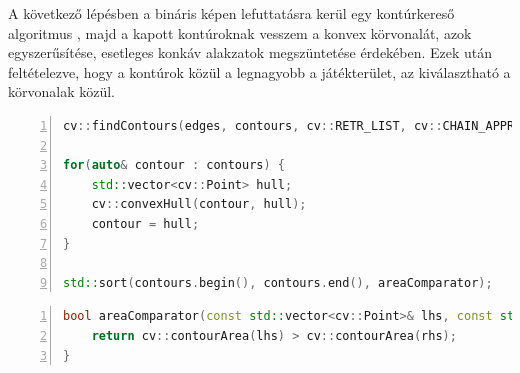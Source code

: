 \par A következő lépésben a bináris képen lefuttatásra kerül egy kontúrkereső algoritmus \cite{SUZUKI198532}, majd a kapott kontúroknak vesszem a konvex körvonalát, azok egyszerűsítése, esetleges konkáv alakzatok megszüntetése érdekében. Ezek után feltételezve, hogy a kontúrok közül a legnagyobb a játékterület, az kiválasztható a körvonalak közül.

\vspace{2mm}
\hspace{-10mm}
\begin{minipage}{\linewidth}
\begin{lstlisting}[language=C++, numbers=left, caption={Kontúrok keresése.}, label={cod:contours}]
cv::findContours(edges, contours, cv::RETR_LIST, cv::CHAIN_APPROX_SIMPLE);

for(auto& contour : contours) {
    std::vector<cv::Point> hull;
    cv::convexHull(contour, hull);
    contour = hull;
}

std::sort(contours.begin(), contours.end(), areaComparator);
\end{lstlisting}
\end{minipage}

\vspace{2mm}
\hspace{-10mm}
\begin{minipage}{\linewidth}
\begin{lstlisting}[language=C++, numbers=left, caption={Sorba rendezéshez használt segédfüggvény.}, label={cod:contours_helper}]
bool areaComparator(const std::vector<cv::Point>& lhs, const std::vector<cv::Point>& rhs) {
    return cv::contourArea(lhs) > cv::contourArea(rhs);
}
\end{lstlisting}
\end{minipage}

